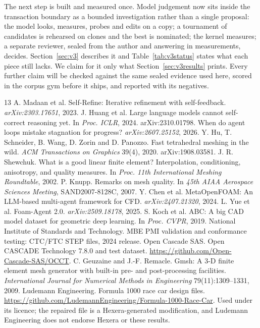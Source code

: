 \documentclass[11pt,onecolumn]{article}
\begin{document}
The next step is built and measured once. Model judgement now sits inside the transaction boundary as
a bounded investigation rather than a single proposal: the model looks, measures, probes and edits
on a copy; a tournament of candidates is rehearsed on clones and the best is nominated; the kernel
measures; a separate reviewer, sealed from the author and answering in measurements, decides.
Section~\ref{sec:v3} describes it and Table~\ref{tab:v3status} states what each piece still lacks.
We claim for it only what Section~\ref{sec:v3results} prints. Every further claim will be checked against the same sealed evidence used
here, scored in the corpus gym before it ships, and reported with its negatives.

\begin{thebibliography}{13}
\footnotesize
{} A. Madaan et al. Self-Refine: Iterative refinement with self-feedback.
  \emph{arXiv:2303.17651}, 2023.
 J. Huang et al. Large language models cannot self-correct reasoning yet. In
  \emph{Proc. ICLR}, 2024. arXiv:2310.01798.
 When do agent loops mistake stagnation for progress? \emph{arXiv:2607.25152}, 2026.
 Y. Hu, T. Schneider, B. Wang, D. Zorin and D. Panozzo. Fast tetrahedral meshing
  in the wild. \emph{ACM Transactions on Graphics} 39(4), 2020. arXiv:1908.03581.
 J. R. Shewchuk. What is a good linear finite element? Interpolation,
  conditioning, anisotropy, and quality measures. In \emph{Proc. 11th International Meshing
  Roundtable}, 2002.
 P. Knupp. Remarks on mesh quality. In \emph{45th AIAA Aerospace Sciences Meeting},
  SAND2007-8128C, 2007.
 Y. Chen et al. MetaOpenFOAM: An LLM-based multi-agent framework for CFD.
  \emph{arXiv:2407.21320}, 2024.
 L. Yue et al. Foam-Agent 2.0. \emph{arXiv:2509.18178}, 2025.
 S. Koch et al. ABC: A big CAD model dataset for geometric deep learning. In
  \emph{Proc. CVPR}, 2019.
 National Institute of Standards and Technology. MBE PMI validation and conformance
  testing: CTC/FTC STEP files, 2024 release.
 Open Cascade SAS. Open CASCADE Technology 7.8.0 and test dataset.
  \url{https://github.com/Open-Cascade-SAS/OCCT}.
 C. Geuzaine and J.-F. Remacle. Gmsh: A 3-D finite element mesh generator with
  built-in pre- and post-processing facilities. \emph{International Journal for Numerical Methods in
  Engineering} 79(11):1309--1331, 2009.
 Ludemann Engineering. Formula 1000 race car design files.
  \url{https://github.com/LudemannEngineering/Formula-1000-Race-Car}. Used under its licence; the
  repaired file is a Hexera-generated modification, and Ludemann Engineering does not endorse Hexera
  or these results.
\end{thebibliography}
\end{document}
